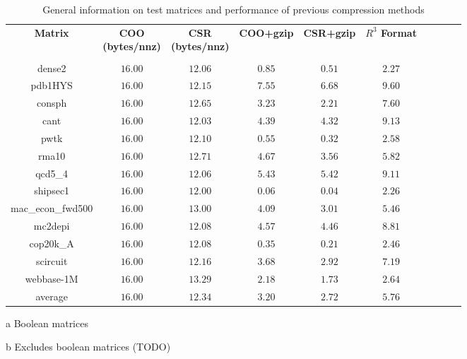 \begin{table*}
\centering
\begin{threeparttable}
\caption{General information on test matrices and performance of previous compression methods}
\label{tbl:analysis}
\begin{tabular}{cccccccccc}
\hline
\bfseries Matrix & \bfseries \shortstack{COO\\(bytes/nnz)} & \bfseries \shortstack{CSR\\(bytes/nnz)} & \bfseries COO+gzip &\bfseries CSR+gzip & \bfseries $R^3$ Format \\
 \\
\hline
dense2\tnote{a} &  $16.00$ & $12.06$ & $0.85$ & $0.51$ & $2.27$ \\
pdb1HYS & $16.00$ & $12.15$ & $7.55$ & $6.68$ & $9.60$ \\
consph & $16.00$ & $12.65$ & $3.23$ & $2.21$ & $7.60$ \\
cant &  $16.00$ & $12.03$ & $4.39$ & $4.32$ & $9.13$ \\
pwtk &  $16.00$ & $12.10$ & $0.55$ & $0.32$ & $2.58$ \\
rma10\tnote{a} &  $16.00$ & $12.71$ & $4.67$ & $3.56$ & $5.82$ \\
qcd5\_4\tnote{a} &$16.00$ & $12.06$ & $5.43$ & $5.42$ & $9.11$ \\
shipsec1 &  $16.00$ & $12.00$ & $0.06$ & $0.04$ & $2.26$ \\
mac\_econ\_fwd500 &  $16.00$ & $13.00$ & $4.09$ & $3.01$ & $5.46$ \\
mc2depi &  $16.00$ & $12.08$ & $4.57$ & $4.46$ & $8.81$ \\
cop20k\_A &  $16.00$ & $12.08$ & $0.35$ & $0.21$ & $2.46$ \\
scircuit & $16.00$ & $12.16$ & $3.68$ & $2.92$ & $7.19$ \\
webbase-1M & $16.00$ & $13.29$ & $2.18$ & $1.73$ & $2.64$ \\
\hline
average\tnote{b} &  $16.00$ & $12.34$ & $3.20$ & $2.72$ & $5.76$ \\

\hline
\end{tabular}
\begin{tablenotes}
\item [a] Boolean matrices
\item [b] Excludes boolean matrices (TODO)
\end{tablenotes}
\end{threeparttable}
\end{table*}

